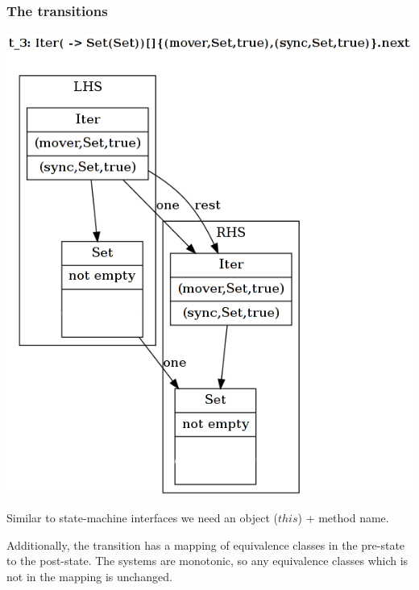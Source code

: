 \documentclass{beamer}
\newcommand{\this}{\ensuremath{\mathit{this}}}
\begin{document}
\begin{frame}
  \frametitle{The transitions}
  \begin{minipage}{0.48\linewidth}
  \includegraphics[scale=0.3]{transition.png}
  \end{minipage}
  \begin{minipage}{0.5\linewidth}
  Similar to state-machine interfaces we need an object (\this) + method name.

  \vspace{3ex}

  Additionally, the transition has a mapping of equivalence classes in the pre-state to the post-state.
  The systems are monotonic, so any equivalence classes which is not in the mapping is unchanged.
  \end{minipage}
\end{frame}
\end{document}
